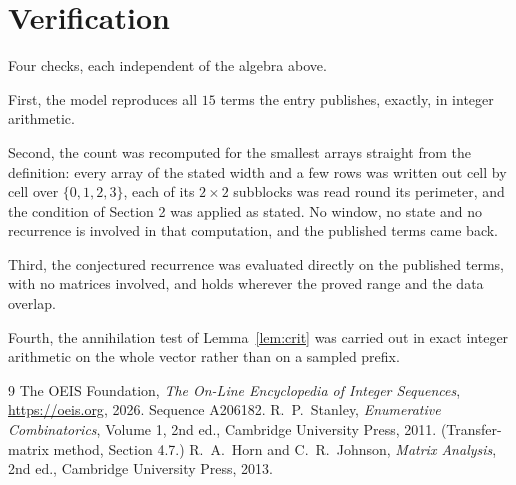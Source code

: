 \documentclass[11pt,a4paper]{article}
\theoremstyle{plain}
\theoremstyle{definition}
\begin{document}
\section{Verification}

Four checks, each independent of the algebra above.

First, the model reproduces all $15$ terms the entry publishes, exactly, in integer
arithmetic.

Second, the count was recomputed for the smallest arrays straight from the definition: every
array of the stated width and a few rows was written out cell by cell over $\{0,1,2,3\}$, each of
its $2\times2$ subblocks was read round its perimeter, and the condition of Section 2 was
applied as stated. No window, no state and no recurrence is involved in that computation, and
the published terms came back.

Third, the conjectured recurrence was evaluated directly on the published terms, with no
matrices involved, and holds wherever the proved range and the data overlap.

Fourth, the annihilation test of Lemma~\ref{lem:crit} was carried out in exact integer
arithmetic on the whole vector rather than on a sampled prefix.

\begin{thebibliography}{9}
 The OEIS Foundation, \emph{The On-Line Encyclopedia of Integer
Sequences}, \url{https://oeis.org}, 2026. Sequence A206182.
 R.~P.~Stanley, \emph{Enumerative Combinatorics}, Volume 1, 2nd ed.,
Cambridge University Press, 2011. (Transfer-matrix method, Section 4.7.)
 R.~A.~Horn and C.~R.~Johnson, \emph{Matrix Analysis}, 2nd ed., Cambridge
University Press, 2013.
\end{thebibliography}
\end{document}
